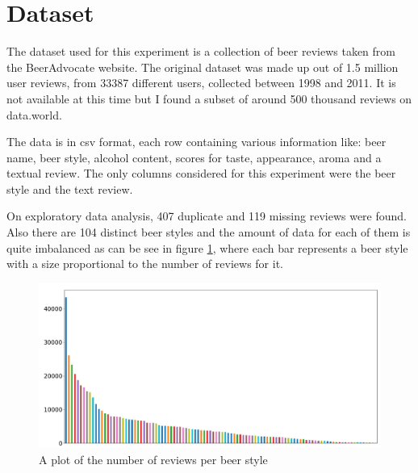 \documentclass[12pt]{article}
\begin{document}
	\title{}
	\author{Stefan Sebastian, 242}
	\date{}
	\maketitle
	
	\begin{abstract}
	
	\end{abstract}

	\newpage
	\tableofcontents
	\newpage
	
	\section{Dataset}
	The dataset used for this experiment is a collection of beer reviews taken from the BeerAdvocate website. The original dataset was made up out of 1.5 million user reviews, from 33387 different users, collected between 1998 and 2011. It is not available at this time but I found a subset of around 500 thousand reviews on data.world\cite{BeerAdvocateData}. 
	
	The data is in csv format, each row containing various information like: beer name, beer style, alcohol content, scores for taste, appearance, aroma and a textual review. The only columns considered for this experiment were the beer style and the text review.
	
	On exploratory data analysis, 407 duplicate and 119 missing reviews were found. Also there are 104 distinct beer styles and the amount of data for each of them is quite imbalanced as can be see in figure \ref{fig:initialDistribution}, where each bar represents a beer style with a size proportional to the number of reviews for it.
	
	\begin{figure}
		\includegraphics[width=\linewidth]{resources/InitialDistribution.png}
		\caption{A plot of the number of reviews per beer style}
		\label{fig:initialDistribution}
	\end{figure}
\end{document}
